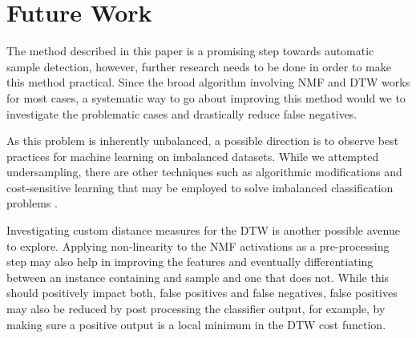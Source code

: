 \documentclass{article}
\begin{document}



\section{Future Work}

The method described in this paper is a promising step towards automatic sample detection, however, further research needs to be done in order to make this method practical. Since the broad algorithm involving NMF and DTW works for most cases, a systematic way to go about improving this method would we to investigate the problematic cases and drastically reduce false negatives.

As this problem is inherently unbalanced, a possible direction is to observe best practices for machine learning on imbalanced datasets. While we attempted undersampling, there are other techniques such as algorithmic modifications and cost-sensitive learning that may be employed to solve imbalanced classification problems \cite{lopez2013insight}.

Investigating custom distance measures for the DTW is another possible avenue to explore. Applying non-linearity to the NMF activations as a pre-processing step may also help in improving the features and eventually differentiating between an instance containing and sample and one that does not. While this should positively impact both, false positives and false negatives, false positives may also be reduced by post processing the classifier output, for example, by making sure a positive output is a local minimum in the DTW cost function.
\end{document}
